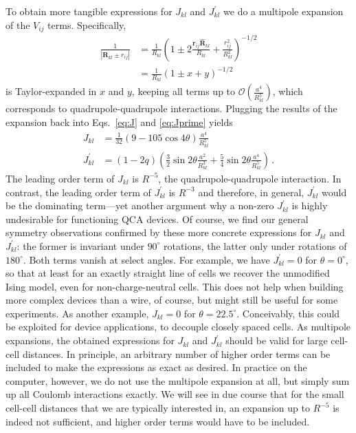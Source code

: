 To obtain more tangible expressions for $J_{kl}$ and $J^{\prime}_{kl}$ we do a
multipole expansion of the $V_{ij}$ terms. Specifically,
%
\begin{equation}
\begin{split}
  \frac{1}{\left| \bm{R}_{kl} \pm r_{ij} \right|}
  &=
  \frac{1}{R_{kl}}
  \left( 
  1 \pm 2 \frac{\bm{r}_{ij} \hat{\bm{R}}_{kl}}{R_{kl}} + \frac{r_{ij}^2}{R_{kl}^2}
  \right)^{-1/2} \\
  &=
  \frac{1}{R_{kl}} \left( 1 \pm x + y \right)^{-1/2}
\end{split}
\end{equation}
%
is Taylor-expanded in $x$ and $y$, keeping all terms up to
$\mathcal{O}\left(\frac{a^4}{R_{kl}^5}\right)$, which corresponds to
quadrupole-quadrupole interactions. Plugging the results of the expansion back
into Eqs.~\eqref{eq:J} and \eqref{eq:Jprime} yields
%
\begin{align}
  \label{eq:J_}
  J_{kl}
  &=
  \frac{ 1 }{ 32 }
  \left(
    9 - 105 \cos{4 \theta}
  \right)
  \frac{ a^4 }{ R_{kl}^5 }
  \\
  \label{eq:Jprime_}
  J^{\prime}_{kl}
  &=
  \left( 1 - 2 q \right)
  \left(
    \frac{ 3 }{ 2 } \sin{2 \theta} \frac{ a^2 }{ R_{kl}^3 } +
    \frac{ 5 }{ 4 } \sin{2 \theta} \frac{ a^4 }{ R_{kl}^5 }
  \right) \, .
\end{align}
%
The leading order term of $J_{kl}$ is $R^{-5}$, the quadrupole-quadrupole
interaction. In contrast, the leading order term of $J^{\prime}_{kl}$ is
$R^{-3}$ and therefore, in general, $J^{\prime}_{kl}$ would be the dominating
term---yet another argument why a non-zero $J^{\prime}_{kl}$ is highly
undesirable for functioning QCA devices. Of course, we find our general symmetry
observations confirmed by these more concrete expressions for $J_{kl}$ and
$J^{\prime}_{kl}$: the former is invariant under $90^{\circ}$ rotations, the
latter only under rotations of $180^{\circ}$. Both terms vanish at select
angles. For example, we have $J^{\prime}_{kl} = 0$ for $\theta = 0^{\circ}$, so
that at least for an exactly straight line of cells we recover the unmodified
Ising model, even for non-charge-neutral cells. This does not help when building
more complex devices than a wire, of course, but might still be useful for some
experiments. As another example, $J_{kl} = 0$ for $\theta = 22.5^{\circ}$.
Conceivably, this could be exploited for device applications, to decouple
closely spaced cells. As multipole expansions, the obtained expressions for
$J_{kl}$ and $J^{\prime}_{kl}$ should be valid for large cell-cell distances. In
principle, an arbitrary number of higher order terms can be included to make the
expressions as exact as desired. In practice on the computer, however, we do not
use the multipole expansion at all, but simply sum up all Coulomb interactions
exactly. We will see in due course that for the small cell-cell distances that
we are typically interested in, an expansion up to $R^{-5}$ is indeed not
sufficient, and higher order terms would have to be included.

